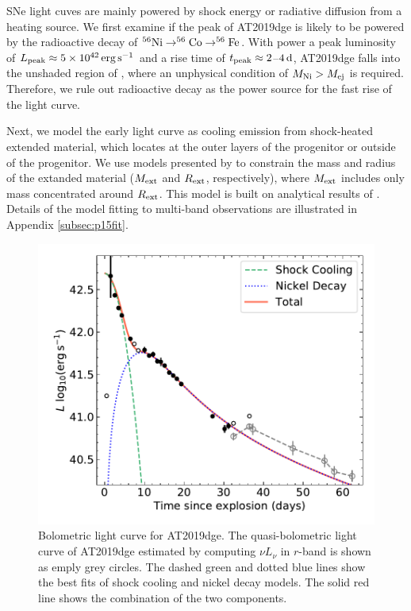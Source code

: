 \documentclass[twocolumn]{aastex63}
\begin{document}
\begin{CJK*}{UTF8}{gbsn}
SNe light cuves are mainly powered by shock energy or radiative diffusion from a heating 
source. We first examine if the peak of AT2019dge is likely to be powered by the radioactive decay of 
$^{56}\rm Ni \rightarrow ^{56}Co \rightarrow ^{56}Fe$. With power a peak luminosity of $L_{\rm 
peak}\approx 5\times 10^{42}\,{\rm erg \, s^{-1}}$ and a rise time of  $t_{\rm peak}\approx 2$--$4\,{\rm 
d}$, AT2019dge falls into the unshaded region of \citet[][Fig.~1]{Kasen2017}, where an unphysical 
condition of $M_{\rm Ni} > M_{\rm ej}$ is required. Therefore, we rule out radioactive decay as the 
power source for the fast rise of the light curve.

Next, we model the early light curve as cooling emission from shock-heated extended material, which 
locates at the outer layers of the progenitor or outside of the progenitor. We use models presented by 
\citet[][hereafter P15]{Piro2015} to constrain the mass and radius of the extanded material ($M_{\rm 
ext}$ and $R_{\rm ext}$, respectively), where $M_{\rm ext}$ includes only mass concentrated around 
$R_{\rm ext}$. This model is built on analytical results of \citet{Nakar2014}. Details of the model fitting 
to multi-band observations are illustrated in Appendix \ref{subsec:p15fit}. 
\begin{figure}
	\centering
	\includegraphics[width=\columnwidth]{figures/Lbb.pdf}
	\caption{Bolometric light curve for AT2019dge. The quasi-bolometric light curve of AT2019dge 
	estimated by computing $\nu L_\nu$ in $r$-band is shown as emply grey circles. The dashed green 
	and dotted blue lines show the best fits of shock cooling and nickel decay models. The solid red line 
	shows the combination of the two components.}
	\label{fig:Lbb}
\end{figure}


\end{CJK*}
\end{document}
